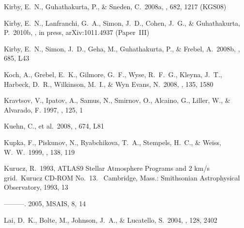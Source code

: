 \documentclass{emulateapj}
\begin{document}
\begin{thebibliography}{}
  Kirby, E.~N., Guhathakurta, P., \& Sneden, C.\ 2008a, \apj, 682,
  1217 (KGS08)

 Kirby, E.~N.,
  Lanfranchi, G.~A., Simon, J.~D., Cohen, J.~G., \& Guhathakurta,
  P.\ 2010b, \apj, in press, arXiv:1011.4937 (Paper~III)

 Kirby, E.~N., Simon, J.~D.,
  Geha, M., Guhathakurta, P., \& Frebel, A.\ 2008b, \apjl, 685, L43

 Koch, A., Grebel, E.~K., Gilmore,
  G.~F., Wyse, R.~F.~G., Kleyna, J.~T., Harbeck, D.~R., Wilkinson,
  M.~I., \& Wyn Evans, N.\ 2008, \aj, 135, 1580





 Kravtsov, V., Ipatov, A.,
  Samus, N., Smirnov, O., Alcaino, G., Liller, W., \& Alvarado,
  F. 1997, \aaps, 125, 1

 Kuehn, C., et al.\ 2008, \apjl,
  674, L81

 Kupka, F., Piskunov, N.,
  Ryabchikova, T.~A., Stempels, H.~C., \& Weiss, W.~W.\ 1999, \aaps,
  138, 119

 Kurucz, R.\ 1993, ATLAS9 Stellar
  Atmosphere Programs and 2 km/s grid.~Kurucz CD-ROM No.~13.~
  Cambridge, Mass.: Smithsonian Astrophysical Observatory, 1993, 13

 ---------. 2005, MSAIS, 8, 14

 Lai, D.~K., Bolte, M., Johnson,
  J.~A., \& Lucatello, S.\ 2004, \aj, 128, 2402


\end{thebibliography}
\end{document}
